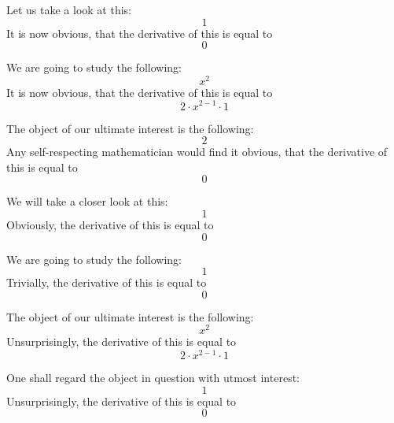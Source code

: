 \documentclass{article}
\begin{document}
Let us take a look at this:
\begin{equation}
1 
\end{equation}
It is now obvious, that the derivative of this is equal to
\begin{equation}
0 
\end{equation}

We are going to study the following:
\begin{equation}
x ^{2 } 
\end{equation}
It is now obvious, that the derivative of this is equal to
\begin{equation}
2 \cdot x ^{2 - 1 } \cdot 1 
\end{equation}

The object of our ultimate interest is the following:
\begin{equation}
2 
\end{equation}
Any self-respecting mathematician would find it obvious, that the derivative of this is equal to
\begin{equation}
0 
\end{equation}

We will take a closer look at this:
\begin{equation}
1 
\end{equation}
Obviously, the derivative of this is equal to
\begin{equation}
0 
\end{equation}

We are going to study the following:
\begin{equation}
1 
\end{equation}
Trivially, the derivative of this is equal to
\begin{equation}
0 
\end{equation}

The object of our ultimate interest is the following:
\begin{equation}
x ^{2 } 
\end{equation}
Unsurprisingly, the derivative of this is equal to
\begin{equation}
2 \cdot x ^{2 - 1 } \cdot 1 
\end{equation}

One shall regard the object in question with utmost interest:
\begin{equation}
1 
\end{equation}
Unsurprisingly, the derivative of this is equal to
\begin{equation}
0 
\end{equation}
\end{document}
